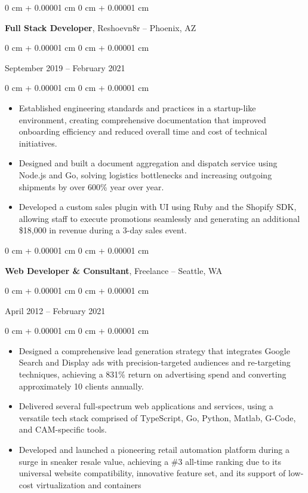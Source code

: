 \documentclass[10pt, letterpaper]{article}
\newenvironment{highlights}{
    \begin{itemize}[
        topsep=0.10 cm,
        parsep=0.10 cm,
        partopsep=0pt,
        itemsep=0pt,
        leftmargin=0 cm + 10pt
    ]
}{
    \end{itemize}
} %
\newenvironment{onecolentry}{
    \begin{adjustwidth}{
        0 cm + 0.00001 cm
    }{
        0 cm + 0.00001 cm
    }
}{
    \end{adjustwidth}
} %
\begin{document}
\vspace{0.2 cm}

\begin{onecolentry}
    \textbf{Full Stack Developer}, Reshoevn8r -- Phoenix, AZ
\end{onecolentry}
\begin{onecolentry}
    September 2019 – February 2021
\end{onecolentry}

\vspace{0.10 cm}
\begin{onecolentry}
    \begin{highlights}
        \item Established engineering standards and practices in a startup-like environment, creating comprehensive documentation that improved onboarding efficiency and reduced overall time and cost of technical initiatives.
        \item Designed and built a document aggregation and dispatch service using Node.js and Go, solving logistics bottlenecks and increasing outgoing shipments by over 600\% year over year.
        \item Developed a custom sales plugin with UI using Ruby and the Shopify SDK, allowing staff to execute promotions seamlessly and generating an additional \$18,000 in revenue during a 3-day sales event.
    \end{highlights}
\end{onecolentry}

\vspace{0.2 cm}

\begin{onecolentry}
    \textbf{Web Developer \& Consultant}, Freelance -- Seattle, WA
\end{onecolentry}
\begin{onecolentry}
    April 2012 – February 2021
\end{onecolentry}

\vspace{0.10 cm}
\begin{onecolentry}
    \begin{highlights}
        \item Designed a comprehensive lead generation strategy that integrates Google Search and Display ads with precision-targeted audiences and re-targeting techniques, achieving a 831\% return on advertising spend and converting approximately 10 clients annually.
        \item Delivered several full-spectrum web applications and services, using a versatile tech stack comprised of TypeScript, Go, Python, Matlab, G-Code, and CAM-specific tools.
        \item Developed and launched a pioneering retail automation platform during a surge in sneaker resale value, achieving a \#3 all-time ranking due to its universal website compatibility, innovative feature set, and its support of low-cost virtualization and containers
    \end{highlights}
\end{onecolentry}
\end{document}
